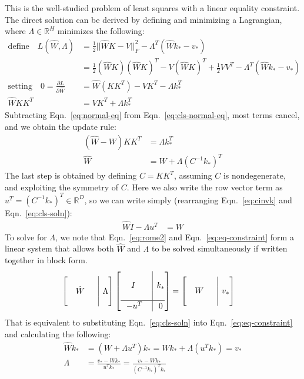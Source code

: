\documentclass{article}
\newcommand{\refeqn}[1]{Eqn.~\ref{eq:#1}}
\newcommand{\lbleq}[1]{\label{eq:#1}}
\begin{document}
\begin{appendices}
This is the well-studied problem of least squares with a linear equality constraint.  The direct solution can be derived by defining and minimizing a Lagrangian, where $\Lambda \in \mathbb{R}^{H}$ minimizes the following:
\begin{align}
\text{define}\quad L(\hat{W}, \Lambda) &= \frac{1}{2} ||\hat{W}K-V||_F^2 - \Lambda^T(\hat{W}k_*-v_*) \\
&=\frac{1}{2} (\hat{W}K)(\hat{W}K)^T - V(\hat{W}K)^T + \frac{1}{2}VV^T - \Lambda^T(\hat{W}k_*-v_*) \\
\text{setting} \quad 0 = \frac{\partial L}{\partial \hat{W}} &= \hat{W}(KK^T) - VK^T -  \Lambda k_*^T\\
\hat{W}KK^T &= VK^T + \Lambda k_*^T
\lbleq{cls-normal-eq}
\end{align}
Subtracting \refeqn{normal-eq} from \refeqn{cls-normal-eq}, most terms cancel, and we obtain the update rule:
\begin{align}
    (\hat{W}-W) KK^T & = \Lambda k_*^T \\
    \hat{W} & = W + \Lambda (C^{-1}k_*)^T
    \lbleq{cls-soln}
\end{align}
The last step is obtained by defining $C = KK^T$, assuming $C$ is nondegenerate, and exploiting the symmetry of $C$.  Here we also write the row vector term as $u^T = (C^{-1}k_*)^T \in \mathbb{R}^{D}$, so we can write simply (rearranging \refeqn{cinvk} and \refeqn{cls-soln}):
\begin{align}
\hat{W}I - \Lambda u^T &= W
\lbleq{rome2}
\end{align}
To solve for $\Lambda$, we note that \refeqn{rome2} and \refeqn{eq-constraint}  form a linear system that allows both $\hat{W}$ and $\Lambda$ to be solved simultaneously if written together in block form.
\begin{align}
\left[\begin{array}{@{}c|c@{}}
\\
\quad \hat{W} \quad\, & \Lambda \\
\,
\end{array}\right]
\left[\begin{array}{@{}c|c@{}}
\\
\quad\; I \quad\;\; & k_* \\
\\ \hline
-u^T \rule{0pt}{2.2ex} & 0
\end{array}\right]
& =
\left[\begin{array}{@{}c|c@{}}
\mathstrut \\
\quad W \quad\, & v_* \\
\mathstrut 
\end{array}\right]
\end{align}
That is equivalent to substituting \refeqn{cls-soln} into \refeqn{eq-constraint} and calculating the following:
\begin{align}
    \hat{W} k_*
    & = (W + \Lambda u^T) k_*
    = W k_* + \Lambda (u^T k_*) = v_* \\
    \Lambda & = \frac{v_* - W k_*}{u^T k_*}
    = \frac{v_* - W k_*}{(C^{-1} k_*)^T k_*}
\lbleq{block-solution}
\end{align}
\clearpage



\end{appendices}
\end{document}
